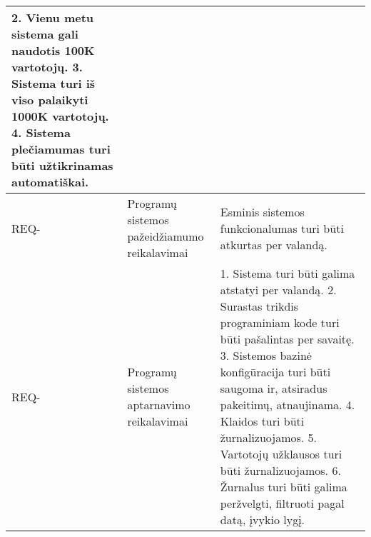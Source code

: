 \documentclass{VUMIFPSkursinis}
\newcounter{counter}
\newcommand{\reqCode}{%
	 \stepcounter{counter}%
	\color{blue} REQ-\thecounter}
\begin{document}
\begin{center}
\begin{longtable}{|C{2cm}|L{5cm}|L{8cm}|}
		{\color{blue} 2. Vienu metu sistema gali naudotis 100K vartotojų. }
		{\color{blue} 3. Sistema turi iš viso palaikyti 1000K vartotojų. }
		{\color{blue} 4. Sistema plečiamumas turi būti užtikrinamas automatiškai. }
		\\ \hline
		\reqCode                                                          &
		Programų sistemos pažeidžiamumo reikalavimai                      &
		Esminis sistemos funkcionalumas turi būti atkurtas per valandą.                                                                                                                                                                                                                                                                                                                                                                                                                                                                                                                                                                                                                                                                                                                                        \\ \hline
		\reqCode                                                          &
		Programų sistemos aptarnavimo reikalavimai                        &
		{\color{blue} 1.} Sistema turi būti galima atstatyi per valandą.
		{\color{blue} 2.} Surastas trikdis programiniam kode turi būti pašalintas per savaitę.                                                                                                                                                                                                                                                                                                                                                                                                                                                                                                                                                                                                                                                                                                                                   
		{\color{blue} 3. Sistemos bazinė konfigūracija turi būti saugoma ir, atsiradus pakeitimų, atnaujinama.}                    
		{\color{blue} 4. Klaidos turi būti žurnalizuojamos.}                    
		{\color{blue} 5. Vartotojų užklausos turi būti žurnalizuojamos.}                    
		{\color{blue} 6. Žurnalus turi būti galima peržvelgti, filtruoti pagal datą, įvykio lygį. }

\end{longtable}
\end{center}
\end{document}
